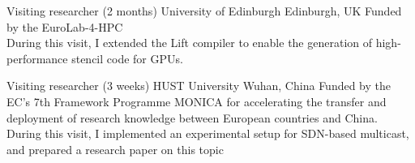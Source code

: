 \documentclass[11pt,a4paper,sans]{moderncv}        %
\begin{document}
					{Visiting researcher (2 months)}
					{University of Edinburgh}
					{Edinburgh, UK}{}
					{Funded by the EuroLab-4-HPC\\
					 During this visit, I extended the Lift compiler to enable the generation of
					 high-performance stencil code for GPUs.
					}

					{Visiting researcher (3 weeks)}
					{HUST University}
					{Wuhan, China}{}
					{Funded by the EC’s 7th Framework Programme MONICA for accelerating the transfer
					 and deployment of research knowledge between European countries and China.
					 During this visit, I implemented an experimental setup for SDN-based multicast,
					 and prepared a research paper on this topic~\cite{humernbrum}
					}

\printbibheading[title={Publications}]
\printbibliography[heading=none]
%
%



\end{document}
